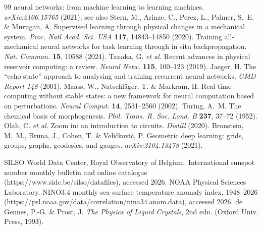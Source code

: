 \documentclass[10pt]{article}
\begin{document}
\begin{thebibliography}{99}
neural networks: from machine learning to learning machines. \emph{arXiv:2106.15765}
(2021); see also Stern, M., Arinze, C., Perez, L., Palmer, S.~E. \& Murugan, A.
Supervised learning through physical changes in a mechanical system. \emph{Proc. Natl
Acad. Sci. USA} \textbf{117}, 14843--14850 (2020).
 Training all-mechanical neural networks for task learning through in
situ backpropagation. \emph{Nat. Commun.} \textbf{15}, 10588 (2024).
 Tanaka, G. \emph{et al.} Recent advances in physical reservoir
computing: a review. \emph{Neural Netw.} \textbf{115}, 100--123 (2019).
 Jaeger, H. The ``echo state'' approach to analysing and training
recurrent neural networks. \emph{GMD Report 148} (2001).
 Maass, W., Natschläger, T. \& Markram, H. Real-time computing
without stable states: a new framework for neural computation based on perturbations.
\emph{Neural Comput.} \textbf{14}, 2531--2560 (2002).
 Turing, A.~M. The chemical basis of morphogenesis.
\emph{Phil. Trans. R. Soc. Lond. B} \textbf{237}, 37--72 (1952).
 Olah, C. \emph{et al.} Zoom in: an introduction to circuits.
\emph{Distill} (2020).
 Bronstein, M.~M., Bruna, J., Cohen, T. \& Veličković, P.
Geometric deep learning: grids, groups, graphs, geodesics, and gauges.
\emph{arXiv:2104.13478} (2021).

 SILSO World Data Center, Royal Observatory of Belgium.
International sunspot number monthly bulletin and online catalogue
(https://www.sidc.be/silso/datafiles), accessed 2026.
 NOAA Physical Sciences Laboratory. NINO3.4 monthly
sea-surface temperature anomaly index, 1948--2026
(https://psl.noaa.gov/data/correlation/nina34.anom.data), accessed 2026.
 de Gennes, P.-G. \& Prost, J. \emph{The Physics of Liquid Crystals},
2nd edn. (Oxford Univ. Press, 1993).
\end{thebibliography}
\end{document}
